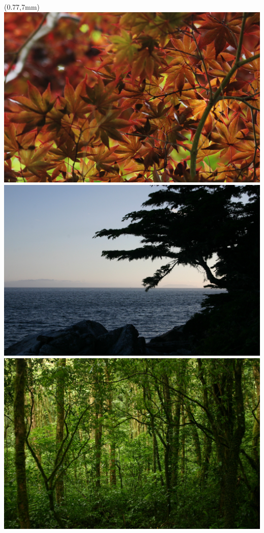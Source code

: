 \documentclass{beamer}
\begin{document}
\begin{frame}
  \begin{textblock*}{4.5cm}(0.77\textwidth,7mm)%
    \includegraphics[width=\textwidth]{figs/random/leaves1.jpg}\\[-2pt]
    \includegraphics[width=\textwidth]{figs/random/sea1.jpg}\\[-2pt]
    \includegraphics[width=\textwidth]{figs/random/cr1.jpg}
  \end{textblock*}

\end{frame}
\end{document}
